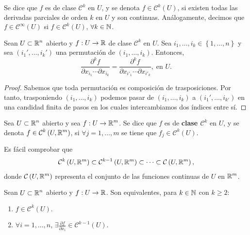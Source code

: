 \begin{definition}
Se dice que $\displaystyle f $ es de clase $\displaystyle \mathcal{C}^{k} $ en $\displaystyle U $, y se denota $\displaystyle f \in \mathcal{C}^{k}\left(U\right) $, si existen todas las derivadas parciales de orden $\displaystyle k $ en $\displaystyle U $ y son continuas. Análogamente, decimos que $\displaystyle f \in \mathcal{C}^{\infty}\left(U\right) $ si $\displaystyle f \in \mathcal{C}^{k}\left(U\right) $, $\displaystyle \forall k \in \mathbb{N} $.
\end{definition}
\begin{colorary}
	Sean $\displaystyle U\subset \mathbb{R}^{n} $ abierto y $\displaystyle f : U \to \mathbb{R} $ de clase $\displaystyle \mathcal{C}^{k} $ en $\displaystyle U $. Sea $\displaystyle i_{1}, \ldots, i_{k} \in \left\{ 1, \ldots, n\right\}  $ y sea $\displaystyle \left(i_{1}', \ldots, i_{k}'\right) $ una permutación de $\displaystyle \left(i_{1}, \ldots, i_{k}\right) $. Entonces,
	\[\frac{\partial ^{k}f}{\partial x_{i_{1}} \cdots \partial x_{i_{k}}} = \frac{\partial ^{k}f}{\partial x_{i'_{1}} \cdots \partial x_{i'_{k}}}, \; \text{en }U .\]
\end{colorary}
\begin{proof}
Sabemos que toda permutación es composición de trasposiciones. Por tanto, trasponiendo $\displaystyle \left(i_{1}, \ldots, i_{k}\right) $ podemos pasar de $\displaystyle \left(i_{1}, \ldots, i_{k}\right) $ a $\displaystyle \left(i_{1}', \ldots, i_{k'}\right) $ en una candidad finita de pasos en los cuales intercambiamos dos índices entre sí. 
\end{proof}
\begin{definition}
	Sea $\displaystyle U\subset \mathbb{R}^{n} $ abierto y sea $\displaystyle f : U \to \mathbb{R}^{m} $. Se dice que $\displaystyle f $ es de \textbf{clase $\displaystyle \mathcal{C}^{k} $} en $\displaystyle U $, y se denota $\displaystyle f \in \mathcal{C}^{k}\left(U, \mathbb{R}^{m}\right) $, si $\displaystyle \forall j = 1, \ldots, m $ se tiene que $\displaystyle f_{j} \in \mathcal{C}^{k}\left(U\right) $.
\end{definition}
\begin{observation}
Es fácil comprobar que 
\[\mathcal{C}^{k}\left(U, \mathbb{R}^{m}\right) \subset \mathcal{C}^{k-1}\left(U, \mathbb{R}^{m}\right) \subset \cdots \subset \mathcal{C}\left(U, \mathbb{R}^{m}\right) ,\]
donde $\displaystyle \mathcal{C}\left(U,\mathbb{R}^{m}\right) $ representa el conjunto de las funciones continuas de $\displaystyle U $ en $\displaystyle \mathbb{R}^{m} $.
\end{observation}
\begin{lema}
Sean $\displaystyle U\subset \mathbb{R}^{n} $ abierto y $\displaystyle f : U \to \mathbb{R} $. Son equivalentes, para $\displaystyle k \in \mathbb{N} $ con $\displaystyle k \geq 2 $:
\begin{enumerate}
\item $\displaystyle f\in \mathcal{C}^{k}\left(U\right) $.
\item $\displaystyle \forall i= 1, \ldots, n $, $\displaystyle \exists \frac{\partial f}{\partial x_{i}} \in \mathcal{C}^{k-1}\left(U\right) $.
\end{enumerate}
\end{lema}
